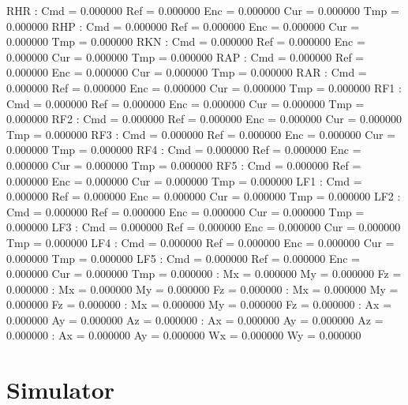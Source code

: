 \begin{code}
RHR : Cmd = 0.000000      Ref = 0.000000     Enc = 0.000000     Cur = 0.000000     Tmp = 0.000000    
RHP : Cmd = 0.000000      Ref = 0.000000     Enc = 0.000000     Cur = 0.000000     Tmp = 0.000000    
RKN : Cmd = 0.000000      Ref = 0.000000     Enc = 0.000000     Cur = 0.000000     Tmp = 0.000000    
RAP : Cmd = 0.000000      Ref = 0.000000     Enc = 0.000000     Cur = 0.000000     Tmp = 0.000000    
RAR : Cmd = 0.000000      Ref = 0.000000     Enc = 0.000000     Cur = 0.000000     Tmp = 0.000000    
RF1 : Cmd = 0.000000      Ref = 0.000000     Enc = 0.000000     Cur = 0.000000     Tmp = 0.000000    
RF2 : Cmd = 0.000000      Ref = 0.000000     Enc = 0.000000     Cur = 0.000000     Tmp = 0.000000    
RF3 : Cmd = 0.000000      Ref = 0.000000     Enc = 0.000000     Cur = 0.000000     Tmp = 0.000000    
RF4 : Cmd = 0.000000      Ref = 0.000000     Enc = 0.000000     Cur = 0.000000     Tmp = 0.000000    
RF5 : Cmd = 0.000000      Ref = 0.000000     Enc = 0.000000     Cur = 0.000000     Tmp = 0.000000    
LF1 : Cmd = 0.000000      Ref = 0.000000     Enc = 0.000000     Cur = 0.000000     Tmp = 0.000000    
LF2 : Cmd = 0.000000      Ref = 0.000000     Enc = 0.000000     Cur = 0.000000     Tmp = 0.000000    
LF3 : Cmd = 0.000000      Ref = 0.000000     Enc = 0.000000     Cur = 0.000000     Tmp = 0.000000    
LF4 : Cmd = 0.000000      Ref = 0.000000     Enc = 0.000000     Cur = 0.000000     Tmp = 0.000000    
LF5 : Cmd = 0.000000      Ref = 0.000000     Enc = 0.000000     Cur = 0.000000     Tmp = 0.000000    
    : Mx = 0.000000     My = 0.000000     Fz = 0.000000    
    : Mx = 0.000000     My = 0.000000     Fz = 0.000000    
    : Mx = 0.000000     My = 0.000000     Fz = 0.000000    
    : Mx = 0.000000     My = 0.000000     Fz = 0.000000    
    : Ax = 0.000000     Ay = 0.000000     Az = 0.000000    
    : Ax = 0.000000     Ay = 0.000000     Az = 0.000000    
    : Ax = 0.000000     Ay = 0.000000     Wx = 0.000000     Wy = 0.000000
\end{code}
\normalsize























\section{Simulator}

